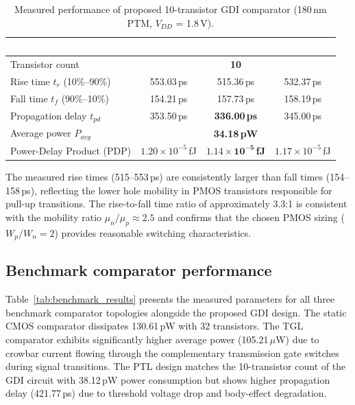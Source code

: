 \documentclass[final,5p,times,twocolumn]{elsarticle}
\begin{document}
\begin{table}[t]
    \centering
    \caption{Measured performance of proposed 10-transistor GDI comparator (180\,nm PTM, $V_{DD}$ = 1.8\,V).}
    \label{tab:gdi_performance}
    \renewcommand{\arraystretch}{1.35}
    \setlength{\tabcolsep}{3.5pt}
    {\small
    \begin{tabular}{|l|c|c|c|}
        \hline
        \rowcolor{worddarkblue}
        \textcolor{white}{\textbf{Performance Metric}} & \textcolor{white}{\textbf{$A<B$}} & \textcolor{white}{\textbf{$A=B$}} & \textcolor{white}{\textbf{$A>B$}} \\
        \hline
        Transistor count & \multicolumn{3}{c|}{\textbf{10}} \\
        \hline
        \rowcolor{wordzebra}
        Rise time $t_r$ (10\%--90\%) & 553.03\,ps & 515.36\,ps & 532.37\,ps \\
        \hline
        Fall time $t_f$ (90\%--10\%) & 154.21\,ps & 157.73\,ps & 158.19\,ps \\
        \hline
        \rowcolor{wordzebra}
        Propagation delay $t_{pd}$ & 353.50\,ps & \textbf{336.00\,ps} & 345.00\,ps \\
        \hline
        Average power $P_{avg}$ & \multicolumn{3}{c|}{\textbf{34.18\,pW}} \\
        \hline
        \rowcolor{wordzebra}
        Power-Delay Product (PDP) & $1.20 \times 10^{-5}$\,fJ & $\mathbf{1.14 \times 10^{-5}}$\,\textbf{fJ} & $1.17 \times 10^{-5}$\,fJ \\
        \hline
    \end{tabular}
    }
\end{table}

The measured rise times (515--553\,ps) are consistently larger than fall times (154--158\,ps), reflecting the lower hole mobility in PMOS transistors responsible for pull-up transitions. The rise-to-fall time ratio of approximately 3.3:1 is consistent with the mobility ratio $\mu_n / \mu_p \approx 2.5$ and confirms that the chosen PMOS sizing ($W_p / W_n = 2$) provides reasonable switching characteristics.

\subsection{Benchmark comparator performance}

Table~\ref{tab:benchmark_results} presents the measured parameters for all three benchmark comparator topologies alongside the proposed GDI design. The static CMOS comparator dissipates 130.61\,pW with 32 transistors. The TGL comparator exhibits significantly higher average power (105.21\,$\mu$W) due to crowbar current flowing through the complementary transmission gate switches during signal transitions. The PTL design matches the 10-transistor count of the GDI circuit with 38.12\,pW power consumption but shows higher propagation delay (421.77\,ps) due to threshold voltage drop and body-effect degradation.
\end{document}

